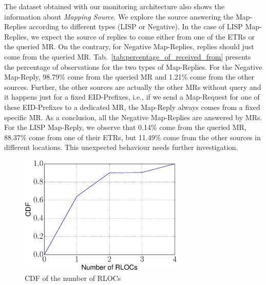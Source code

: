\begin{table}[!t]
    \centering
    \caption{Percentage of Mapping Source}
    \label{tab:percentage_of_received_from}{
	}
\end{table}

The dataset obtained with our monitoring architecture also shows the
information about \emph{Mapping Source}. We explore the source answering the
Map-Replies according to different types (LISP or Negative). In the case of
LISP Map-Replies, we expect the source of replies to come either from one of
the ETRs or the queried MR. On the contrary, for Negative Map-Replies, replies
should just come from the queried MR. Tab.~\ref{tab:percentage_of_received_from} presents the percentage of
observations for the two types of Map-Replies. For the Negative Map-Reply,
98.79\% come from the queried MR and 1.21\% come from the other sources.
Further, the other sources are actually the other MRs without query and it
happens just for a fixed EID-Prefixes, i.e., if we send a Map-Request for one
of these EID-Prefixes to a dedicated MR, the Map-Reply always comes from a
fixed specific MR. As a conclusion, all the Negative Map-Replies are answered
by MRs. For the LISP Map-Reply, we observe that 0.14\% come from the queried
MR, 88.37\% come from one of their ETRs, but 11.49\% come from the other
sources in different locations. This unexpected behaviour needs further
investigation.

\begin{figure}[!t]
        \centering
        \includegraphics[width=0.7\textwidth]{Pics/CDF_of_RLOCs.eps}
        \caption{CDF of the number of RLOCs}
        \label{CDF_of_RLOCs}
\end{figure}

